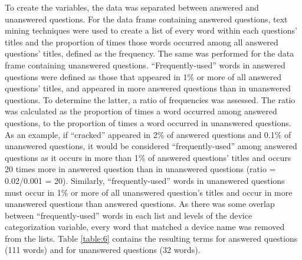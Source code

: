 \documentclass[]{interact}\usepackage[]{graphicx}\usepackage[]{color}
\begin{document}
{To create the variables, the data was separated between answered and unanswered questions. For the data frame containing answered questions, text mining techniques were used to create a list of every word within each questions' titles and the proportion of times those words occurred among all answered questions' titles, defined as the frequency. The same was performed for the data frame containing unanswered questions. ``Frequently-used'' words in answered questions were defined as those that appeared in 1\% or more of all answered questions' titles, and appeared in more answered questions than in unanswered questions. To determine the latter, a ratio of frequencies was assessed. The ratio was calculated as the proportion of times a word occurred among answered questions, to the proportion of times a word occurred in unanswered questions. As an example, if ``cracked'' appeared in 2\% of answered questions and 0.1\% of unanswered questions, it would be considered ``frequently-used'' among answered questions as it occurs in more than 1\% of answered questions' titles and occurs 20 times more in answered question than in unanswered questions (ratio = 0.02/0.001 = 20). Similarly, ``frequently-used'' words in unanswered questions must occur in 1\% or more of all unanswered question's titles and occur in more unanswered questions than answered questions. As there was some overlap between ``frequently-used'' words in each list and levels of the device categorization variable, every word that matched a device name was removed from the lists. Table \ref{table:6} contains the resulting terms for answered questions (111 words) and for unanswered questions (32 words). 

}
\end{document}
